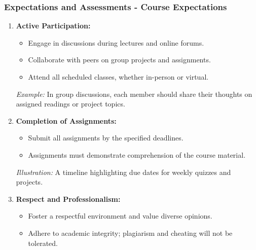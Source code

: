 \documentclass[aspectratio=169]{beamer}
\begin{document}
\begin{frame}[fragile]
  \frametitle{Expectations and Assessments - Course Expectations}
  
  \begin{enumerate}
    \item \textbf{Active Participation:}
      \begin{itemize}
        \item Engage in discussions during lectures and online forums.
        \item Collaborate with peers on group projects and assignments.
        \item Attend all scheduled classes, whether in-person or virtual.
      \end{itemize}
      \textit{Example:} In group discussions, each member should share their thoughts on assigned readings or project topics.

    \item \textbf{Completion of Assignments:}
      \begin{itemize}
        \item Submit all assignments by the specified deadlines.
        \item Assignments must demonstrate comprehension of the course material.
      \end{itemize}
      \textit{Illustration:} A timeline highlighting due dates for weekly quizzes and projects.

    \item \textbf{Respect and Professionalism:}
      \begin{itemize}
        \item Foster a respectful environment and value diverse opinions.
        \item Adhere to academic integrity; plagiarism and cheating will not be tolerated.
      \end{itemize}
  \end{enumerate}
\end{frame}
\end{document}

